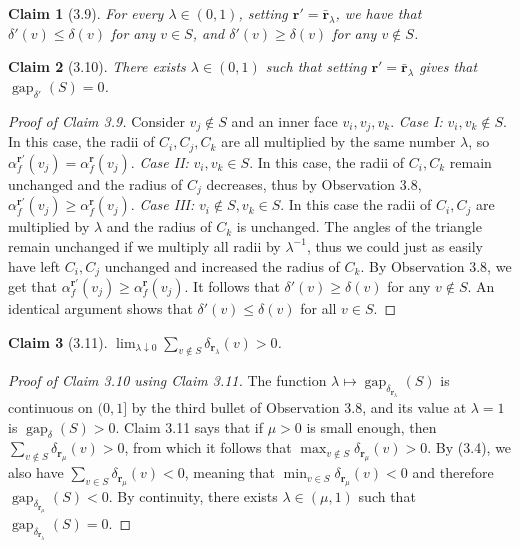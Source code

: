 \documentclass[UTF8,11pt]{ctexart}
\newtheorem*{claim}{Claim}
\theoremstyle{definition}
\begin{document}
\begin{claim}[3.9]
For every $\lambda\in(0,1)$, setting $\mathbf r'=\bar{\mathbf r}_\lambda$, we have that $\delta'(v)\le\delta(v)$ for any $v\in S$, and $\delta'(v)\ge\delta(v)$ for any $v\notin S$.
\end{claim}
\begin{claim}[3.10]
There exists $\lambda\in(0,1)$ such that setting $\mathbf r'=\bar{\mathbf r}_\lambda$ gives that $\operatorname{gap}_{\delta'}(S)=0$.
\end{claim}
\begin{proof}[Proof of Claim 3.9]
Consider $v_j\notin S$ and an inner face $v_i,v_j,v_k$.
\emph{Case I:} $v_i,v_k\notin S$. In this case, the radii of $C_i,C_j,C_k$ are all multiplied by the same number $\lambda$, so $\alpha_f^{\mathbf r'}(v_j)=\alpha_f^{\mathbf r}(v_j)$.
\emph{Case II:} $v_i,v_k\in S$. In this case, the radii of $C_i,C_k$ remain unchanged and the radius of $C_j$ decreases, thus by Observation 3.8, $\alpha_f^{\mathbf r'}(v_j)\ge\alpha_f^{\mathbf r}(v_j)$.
\emph{Case III:} $v_i\notin S,v_k\in S$. In this case the radii of $C_i,C_j$ are multiplied by $\lambda$ and the radius of $C_k$ is unchanged. The angles of the triangle remain unchanged if we multiply all radii by $\lambda^{-1}$, thus we could just as easily have left $C_i,C_j$ unchanged and increased the radius of $C_k$. By Observation 3.8, we get that $\alpha_f^{\mathbf r'}(v_j)\ge\alpha_f^{\mathbf r}(v_j)$.
It follows that $\delta'(v)\ge\delta(v)$ for any $v\notin S$. An identical argument shows that $\delta'(v)\le\delta(v)$ for all $v\in S$.
\end{proof}
\begin{claim}[3.11]
$\displaystyle\lim_{\lambda\downarrow0}\sum_{v\notin S}\delta_{\mathbf r_\lambda}(v)>0$.
\end{claim}
\begin{proof}[Proof of Claim 3.10 using Claim 3.11]
The function $\lambda\mapsto\operatorname{gap}_{\delta_{\mathbf r_\lambda}}(S)$ is continuous on $(0,1]$ by the third bullet of Observation 3.8, and its value at $\lambda=1$ is $\operatorname{gap}_{\delta}(S)>0$. Claim 3.11 says that if $\mu>0$ is small enough, then
$\sum_{v\notin S}\delta_{\mathbf r_\mu}(v)>0$, from which it follows that $\max_{v\notin S}\delta_{\mathbf r_\mu}(v)>0$. By (3.4), we also have $\sum_{v\in S}\delta_{\mathbf r_\mu}(v)<0$, meaning that $\min_{v\in S}\delta_{\mathbf r_\mu}(v)<0$ and therefore $\operatorname{gap}_{\delta_{\mathbf r_\mu}}(S)<0$. By continuity, there exists $\lambda\in(\mu,1)$ such that $\operatorname{gap}_{\delta_{\mathbf r_\lambda}}(S)=0$.
\end{proof}
\end{document}
